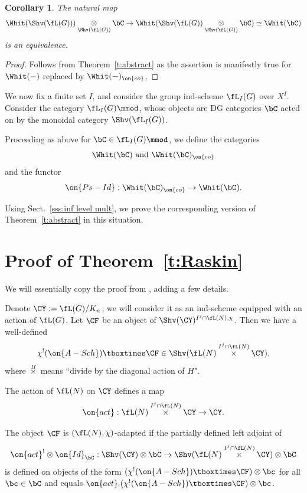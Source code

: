 \documentclass[9pt]{amsart}
\newtheorem{cor}[subsubsection]{Corollary}
\theoremstyle{definition}
\theoremstyle{remark}
\newcommand{\thmref}[1]{Theorem~\ref{#1}}
\newcommand{\secref}[1]{Sect.~\ref{#1}}
\numberwithin{equation}{section}
\begin{document}
\begin{cor}
The natural map
$$\Whit(\Shv(\fL(G)))\underset{\Shv(\fL(G))}\otimes \bC  \to \Whit(\Shv(\fL(G))\underset{\Shv(\fL(G))}\otimes \bC)\simeq \Whit(\bC)$$
is an equivalence.
\end{cor} 

\begin{proof}
Follows from \thmref{t:abstract} as the assertion is manifestly true for $\Whit(-)$ replaced by $\Whit(-)_{\on{co}}$,
\end{proof} 




We now fix a finite set $I$, and consider the group ind-scheme $\fL_I(G)$ over $X^I$. Consider the category $\fL_I(G)\mmod$,
whose objects are DG categories $\bC$ acted on by the monoidal category $\Shv(\fL_I(G))$. 

\medskip

Proceeding as above for $\bC\in \fL_I(G)\mmod$, we define the categories 
$$\Whit(\bC) \text{ and } \Whit(\bC)_{\on{co}}$$
and the functor
$$\on{Ps-Id}: \Whit(\bC)_{\on{co}}\to \Whit(\bC).$$

Using \secref{sss:inf level mult}, we prove the corresponding version of \thmref{t:abstract}
in this situation.

\appendix 

\section{Proof of \thmref{t:Raskin}}  \label{s:proof of Rask} 

We will essentially copy the proof from \cite[Sect. 2.12]{Ras}, adding a few details. 


\sssec{}

Denote $\CY:=\fL(G)/K_n$; we will consider it as an ind-scheme equipped with an action of $\fL(G)$. Let
$\CF$ be an object of $\Shv(\CY)^{I^j\cap \fL(N),\chi}$. Then we have a well-defined 
$$\chi^!(\on{A-Sch})\tboxtimes \CF\in \Shv(\fL(N) \overset{I^j\cap \fL(N)}\times \CY),$$
where $\overset{H}\times$ means ``divide by the diagonal action of $H$". 

\medskip

The action of $\fL(N)$ on $\CY$ defines a map
$$\on{act}:\fL(N) \overset{I^j\cap \fL(N)}\times \CY\to \CY.$$

The object $\CF$ is $(\fL(N),\chi)$-adapted if the partially defined left adjoint of
$$\on{act}^!\otimes \on{Id}_\bC:\Shv(\CY)\otimes \bC\to \Shv(\fL(N) \overset{I^j\cap \fL(N)}\times \CY)\otimes \bC$$
is defined on objects of the form $(\chi^!(\on{A-Sch})\tboxtimes \CF)\otimes \bc$ for all $\bc\in \bC$ and equals 
$\on{act}_!(\chi^!(\on{A-Sch})\tboxtimes \CF)\otimes \bc$. 
\end{document}
